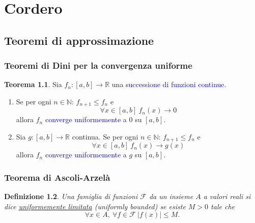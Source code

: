 \documentclass[10pt]{book}
\newcommand{\1}{\mathds{1}}
\newcommand{\R}{\mathds{R}}
\newcommand{\N}{\mathds{N}}
\theoremstyle{definition}%
\newtheorem{thm}{Teorema}[section]
\theoremstyle{plain}
\newtheorem{definizione}[thm]{Definizione}
\theoremstyle{remark}
\renewcommand{\href}[2]{\textcolor{blue}{#2}}
\begin{document}
\part{Cordero}
\chapter{Teoremi di approssimazione}
\label{sec:org74585fb}

\section{Teoremi di Dini per la convergenza uniforme}
\label{sec:org0955ec5}
\begin{thm}
Sia \(f_{n}:[a,b]\to \R\) una \href{../../../../../org/roam/20250629105815-successione_di_funzioni.org}{successione di funzioni} \href{../../../../../org/roam/20250103103252-funzione_continua.org}{continue}.
\begin{enumerate}
\item Se per ogni \(n \in \N\): \(f_{n+1}\le f_{n}\) e
\begin{equation*}
 \forall x \in [a,b]\ f_{n}(x)\to 0
\end{equation*}
allora \(f_{n}\) \href{../../../../../org/roam/20250629105745-convergenza_uniforme.org}{converge uniformemente} a \(0\) su \([a,b]\).
\item Sia \(g:[a,b]\to \R\) continua. Se per ogni \(n \in \N\): \(f_{n+1}\le f_{n}\) e
\begin{equation*}
 \forall x \in [a,b]\ f_{n}(x)\to g(x)
\end{equation*}
allora \(f_{n}\) \href{../../../../../org/roam/20250629105745-convergenza_uniforme.org}{converge uniformemente} a \(g\) su \([a,b]\).
\end{enumerate}
\end{thm}
\section{Teorema di Ascoli-Arzelà}
\label{sec:orgec775db}

\begin{definizione}
Una famiglia di funzioni \(\mathcal{F}\) da un insieme \(A\) a valori reali si dice \uline{uniformemente limitata} (\emph{uniformly bounded}) se esiste \(M > 0\) tale che
\begin{equation*}
\forall x \in A,\ \forall f \in \mathcal{F}\ |f(x)|\le M.
\end{equation*}
\end{definizione}
\end{document}
